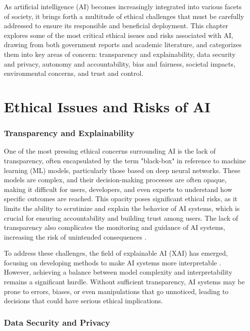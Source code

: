 As artificial intelligence (AI) becomes increasingly integrated into various facets of society, it brings forth a multitude of ethical challenges that must be carefully addressed to ensure its responsible and beneficial deployment. This chapter explores some of the most critical ethical issues and risks associated with AI, drawing from both government reports and academic literature, and categorizes them into key areas of concern: transparency and explainability, data security and privacy, autonomy and accountability, bias and fairness, societal impacts, environmental concerns, and trust and control.

\section{Ethical Issues and Risks of AI}

\subsubsection{Transparency and Explainability}

One of the most pressing ethical concerns surrounding AI is the lack of transparency, often encapsulated by the term "black-box" in reference to machine learning (ML) models, particularly those based on deep neural networks. These models are complex, and their decision-making processes are often opaque, making it difficult for users, developers, and even experts to understand how specific outcomes are reached. This opacity poses significant ethical risks, as it limits the ability to scrutinize and explain the behavior of AI systems, which is crucial for ensuring accountability and building trust among users. The lack of transparency also complicates the monitoring and guidance of AI systems, increasing the risk of unintended consequences \cite{huang2022overview}.

To address these challenges, the field of explainable AI (XAI) has emerged, focusing on developing methods to make AI systems more interpretable \cite{molnar2020interpretable}. However, achieving a balance between model complexity and interpretability remains a significant hurdle. Without sufficient transparency, AI systems may be prone to errors, biases, or even manipulations that go unnoticed, leading to decisions that could have serious ethical implications.

\subsubsection{Data Security and Privacy}

